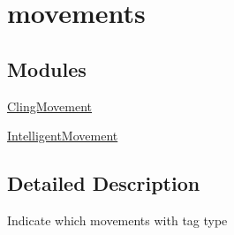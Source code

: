 \hypertarget{group__movements}{
\section{movements}
\label{df/d10/group__movements}
}
\subsection*{Modules}
\begin{DoxyCompactItemize}
\item 
\hyperlink{group___cling_movement}{ClingMovement}
\item 
\hyperlink{group___intelligent_movement}{IntelligentMovement}
\end{DoxyCompactItemize}


\subsection{Detailed Description}
Indicate which movements with tag type 